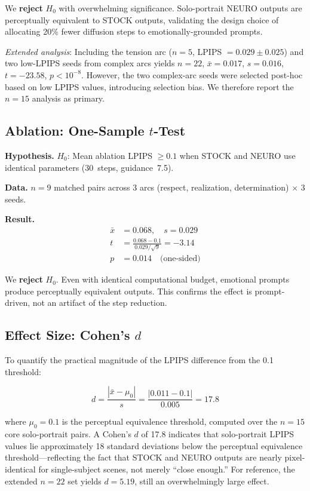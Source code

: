 \documentclass[10pt,twocolumn,letterpaper]{article}
\begin{document}
We \textbf{reject} $H_0$ with overwhelming significance. Solo-portrait NEURO outputs are perceptually equivalent to STOCK outputs, validating the design choice of allocating 20\% fewer diffusion steps to emotionally-grounded prompts.

\textit{Extended analysis}: Including the tension arc ($n{=}5$, LPIPS $= 0.029 \pm 0.025$) and two low-LPIPS seeds from complex arcs yields $n = 22$, $\bar{x} = 0.017$, $s = 0.016$, $t = -23.58$, $p < 10^{-8}$. However, the two complex-arc seeds were selected post-hoc based on low LPIPS values, introducing selection bias. We therefore report the $n = 15$ analysis as primary.

\subsection{Ablation: One-Sample $t$-Test}

\textbf{Hypothesis.} $H_0$: Mean ablation LPIPS $\geq 0.1$ when STOCK and NEURO use identical parameters (30~steps, guidance~7.5).

\textbf{Data.} $n = 9$ matched pairs across 3 arcs (respect, realization, determination) $\times$ 3 seeds.

\textbf{Result.}
\begin{align}
\bar{x} &= 0.068, \quad s = 0.029 \nonumber \\
t &= \frac{0.068 - 0.1}{0.029 / \sqrt{9}} = -3.14 \nonumber \\
p &= 0.014 \quad \text{(one-sided)}
\end{align}

We \textbf{reject} $H_0$. Even with identical computational budget, emotional prompts produce perceptually equivalent outputs. This confirms the effect is prompt-driven, not an artifact of the step reduction.

\subsection{Effect Size: Cohen's $d$}

To quantify the practical magnitude of the LPIPS difference from the 0.1 threshold:

\begin{equation}
d = \frac{|\bar{x} - \mu_0|}{s} = \frac{|0.011 - 0.1|}{0.005} = 17.8
\end{equation}

\noindent where $\mu_0 = 0.1$ is the perceptual equivalence threshold, computed over the $n = 15$ core solo-portrait pairs. A Cohen's $d$ of 17.8 indicates that solo-portrait LPIPS values lie approximately 18 standard deviations below the perceptual equivalence threshold---reflecting the fact that STOCK and NEURO outputs are nearly pixel-identical for single-subject scenes, not merely ``close enough.'' For reference, the extended $n = 22$ set yields $d = 5.19$, still an overwhelmingly large effect.
\end{document}
